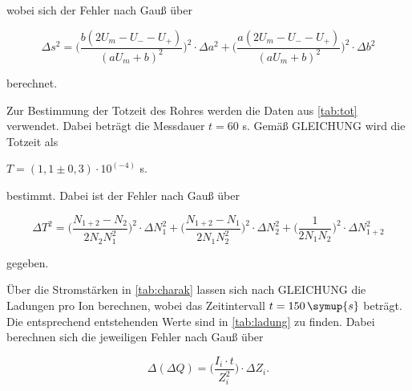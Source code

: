 wobei sich der Fehler nach Gauß über

\begin{equation}
    \Delta s^2 = \bigg( \dfrac{b\left(2 U_m - U_- -U_+ \right)}{\left(a U_m + b \right)^2} \bigg)^2 \cdot \Delta a^2 + \bigg( \dfrac{a\left(2U_m - U_- - U_+ \right)}{\left(a U_m + b \right)^2} \bigg)^2 \cdot \Delta b^2
\end{equation}

berechnet.




Zur Bestimmung der Totzeit des Rohres werden die Daten aus \autoref{tab:tot} verwendet.
Dabei beträgt die Messdauer $t = 60$ s.
Gemäß GLEICHUNG wird die Totzeit als

\begin{center}
    $T = (1,1 \pm 0,3) \cdot 10^(-4)$ s.
\end{center}

bestimmt. Dabei ist der Fehler nach Gauß über

\begin{equation}
    \Delta T^2 = \bigg( \dfrac{N_{1+2} - N_2}{2 N_2 N_1^2} \bigg)^2 \cdot \Delta N_1^2 + \bigg( \dfrac{N_{1+2} - N_1}{2 N_1 N_2^2}  \bigg)^2 \cdot \Delta N_2^2 + \bigg( \dfrac{1}{2 N_1 N_2} \bigg)^2 \cdot \Delta N_{1+2}^2
\end{equation}

gegeben.

Über die Stromstärken in \autoref{tab:charak} lassen sich nach GLEICHUNG die Ladungen pro Ion berechnen, wobei das Zeitintervall $t = 150 \, \symup{s}$ beträgt.
Die entsprechend entstehenden Werte sind in \autoref{tab:ladung} zu finden.
Dabei berechnen sich die jeweiligen Fehler nach Gauß über

\begin{equation}
    \Delta (\Delta Q) = \bigg( \frac{I_i \cdot t}{Z_i^2} \bigg) \cdot \Delta Z_i.
\end{equation}

